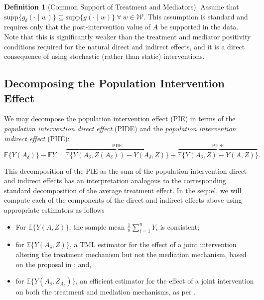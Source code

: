 \documentclass[
  12pt, krantz2,
]{krantz}
\providecommand{\tightlist}{%
  \setlength{\itemsep}{0pt}\setlength{\parskip}{0pt}}
\newcommand{\E}{\mathbb{E}}
\newcommand{\1}{\mathbbm{1}}
\theoremstyle{definition}
\newtheorem{definition}{Definition}[chapter]
\theoremstyle{definition}
\theoremstyle{definition}
\theoremstyle{definition}
\theoremstyle{remark}
\begin{document}
\begin{definition}[Common Support of Treatment and Mediators]
Assume that \(\text{supp}\{g_{\delta}(\cdot \mid w)\} \subseteq \text{supp}\{g(\cdot \mid w)\}~\forall~w \in \mathcal{W}\). This assumption is
standard and requires only that the post-intervention value of \(A\) be supported
in the data. Note that this is significantly weaker than the treatment and
mediator positivity conditions required for the natural direct and indirect
effects, and it is a direct consequence of using stochastic (rather than static)
interventions.
\end{definition}

\hypertarget{decomposing-the-population-intervention-effect}{%
\subsection{Decomposing the Population Intervention Effect}\label{decomposing-the-population-intervention-effect}}

We may decompose the population intervention effect (PIE) in terms of the
\emph{population intervention direct effect} (PIDE) and the \emph{population
intervention indirect effect} (PIIE):
\begin{equation*}
  \mathbb{E}\{Y(A_\delta)\} - \mathbb{E}Y =
    \overbrace{\mathbb{E}\{Y(A_\delta, Z(A_\delta))
      - Y(A_\delta, Z)\}}^{\text{PIIE}} +
    \overbrace{\mathbb{E}\{Y(A_\delta, Z) - Y(A, Z)\}}^{\text{PIDE}}.
\end{equation*}

This decomposition of the PIE as the sum of the population intervention direct
and indirect effects has an interpretation analogous to the corresponding
standard decomposition of the average treatment effect. In the sequel, we will
compute each of the components of the direct and indirect effects above using
appropriate estimators as follows

\begin{itemize}
\tightlist
\item
  For \(\E\{Y(A, Z)\}\), the sample mean \(\frac{1}{n}\sum_{i=1}^n Y_i\) is
  consistent;
\item
  for \(\E\{Y(A_{\delta}, Z)\}\), a TML estimator for the effect of a joint
  intervention altering the treatment mechanism but not the mediation mechanism,
  based on the proposal in \citet{diaz2020causal}; and,
\item
  for \(\E\{Y(A_{\delta}, Z_{A_{\delta}})\}\), an efficient estimator for the
  effect of a joint intervention on both the treatment and mediation mechanisms,
  as per \citet{kennedy2019nonparametric}.
\end{itemize}
\end{document}
